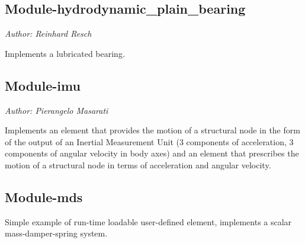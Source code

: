\subsection{Module-hydrodynamic\_plain\_bearing}
\emph{Author: Reinhard Resch}

\noindent
Implements a lubricated bearing.

\subsection{Module-imu}
\emph{Author: Pierangelo Masarati}

\noindent
Implements an element that provides the motion of a structural node
in the form of the output of an Inertial Measurement Unit
(3 components of acceleration, 3 components of angular velocity in body axes)
and an element that prescribes the motion of a structural node
in terms of acceleration and angular velocity.

\subsection{Module-mds}
Simple example of run-time loadable user-defined element,
implements a scalar mass-damper-spring system.


